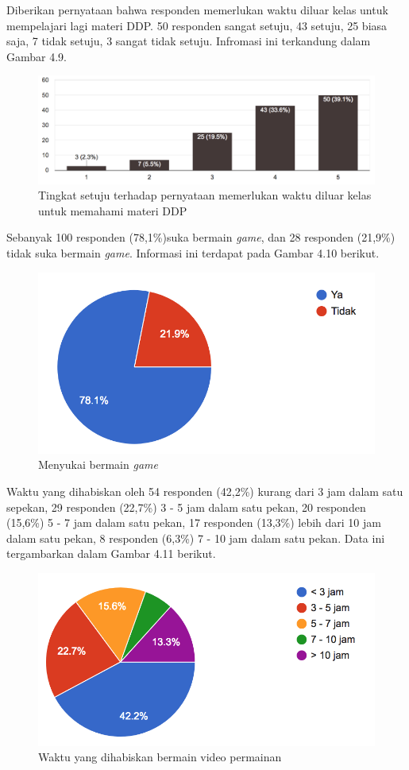 	Diberikan pernyataan bahwa responden memerlukan waktu diluar kelas untuk mempelajari lagi materi DDP. 50 responden sangat setuju, 43 setuju, 25 biasa saja, 7 tidak setuju, 3 sangat tidak setuju. Infromasi ini terkandung dalam Gambar 4.9.
	\begin{figure}
		\includegraphics[width=\linewidth]{pics/perlu-waktu-luar-kelas}
		\caption{Tingkat setuju terhadap pernyataan memerlukan waktu diluar kelas untuk memahami materi DDP}
		\centering
	\end{figure}
	Sebanyak 100 responden (78,1\%)suka bermain \textit{game}, dan 28 responden (21,9\%) tidak suka bermain \textit{game}. Informasi ini terdapat pada Gambar 4.10 berikut.
	\begin{figure}
		\includegraphics[width=\linewidth]{pics/suka-bermain-game}
		\caption{Menyukai bermain \textit{game}}
		\centering
	\end{figure}
	Waktu yang dihabiskan oleh 54 responden (42,2\%) kurang dari 3 jam dalam satu sepekan, 29 responden (22,7\%) 3 - 5 jam dalam satu pekan, 20 responden (15,6\%) 5 - 7 jam dalam satu pekan, 17 responden (13,3\%) lebih dari 10 jam dalam satu pekan, 8 responden (6,3\%) 7 - 10 jam dalam satu pekan. Data ini tergambarkan dalam Gambar 4.11 berikut.
	\begin{figure}
		\includegraphics[width=\linewidth]{pics/waktu-bermain-game}
		\caption{Waktu yang dihabiskan bermain video permainan}
		\centering
	\end{figure}
